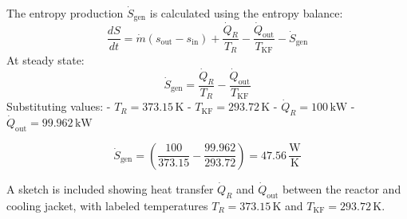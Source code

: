 The entropy production \( \dot{S}_{\text{gen}} \) is calculated using the entropy balance:  
\[
\frac{dS}{dt} = \dot{m}(s_{\text{out}} - s_{\text{in}}) + \frac{\dot{Q}_R}{T_R} - \frac{\dot{Q}_{\text{out}}}{T_{\text{KF}}} - \dot{S}_{\text{gen}}
\]  
At steady state:  
\[
\dot{S}_{\text{gen}} = \frac{\dot{Q}_R}{T_R} - \frac{\dot{Q}_{\text{out}}}{T_{\text{KF}}}
\]  
Substituting values:  
- \( T_R = 373.15 \, \text{K} \)  
- \( T_{\text{KF}} = 293.72 \, \text{K} \)  
- \( \dot{Q}_R = 100 \, \text{kW} \)  
- \( \dot{Q}_{\text{out}} = 99.962 \, \text{kW} \)  

\[
\dot{S}_{\text{gen}} = \left(\frac{100}{373.15} - \frac{99.962}{293.72}\right) = 47.56 \, \frac{\text{W}}{\text{K}}
\]  

A sketch is included showing heat transfer \( \dot{Q}_R \) and \( \dot{Q}_{\text{out}} \) between the reactor and cooling jacket, with labeled temperatures \( T_R = 373.15 \, \text{K} \) and \( T_{\text{KF}} = 293.72 \, \text{K} \).